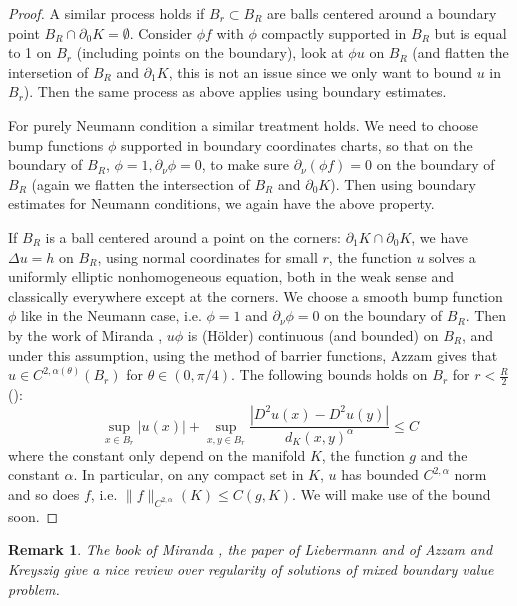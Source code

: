 \documentclass[12pt]{amsart}
\newcommand{\p}{\partial}
\newtheorem{remark}[theorem]{Remark}
\numberwithin{equation}{section}
\begin{document}
\begin{proof}
		A similar process holds if $B_r\subset B_R$ are balls centered around a boundary point $B_R \cap \partial_0 K = \emptyset$. Consider $\phi f$ with $\phi$ compactly supported in $B_R$ but is equal to 1 on $B_r$ (including points on the boundary), look at $\phi u$ on $B_R$ (and flatten the intersetion of $B_R$ and $\partial_1 K$, this is not an issue since we only want to bound $u$ in $B_r$). Then the same process as above applies using boundary estimates. 
		
		For purely Neumann condition a similar treatment holds. We need to choose bump functions $\phi$ supported in boundary coordinates charts, so that on the boundary of $B_R$, $\phi=1, \partial_{\nu}\phi=0$, to make sure $\partial_{\nu} (\phi f)=0$ on the boundary of $B_R$ (again we flatten the intersection of $B_R$  and $\partial_0 K$). Then using boundary estimates for Neumann conditions, we again have the above property.


		If $B_R$ is a ball centered around a point on the corners: $\partial_1 
		K \cap \partial_0 K$, we have $\Delta  u=h$ on $B_R$, using normal coordinates for small $r$, the function $u$ solves a uniformly elliptic nonhomogeneous equation, both in the weak sense and classically everywhere except at the corners. We choose a smooth bump function $\phi$ like in the Neumann case, i.e. $\phi=1$ and $\p_{\nu} \phi=0$ on the boundary of $B_R$. Then by the work of Miranda \cite{Miran1955-SulProblemaMisto},  $u\phi$ is (H\"older) continuous (and bounded)  on $B_R$, and under this assumption, using the method of barrier functions, Azzam  \cite{azzam1981smoothness} gives that $u \in C^{2,\alpha(\theta)}(B_r)$ for $\theta \in (0,\pi/4)$. 
		The following bounds holds on $B_r$ for $r <\frac{R}{2}$ (\cite{azzam1981smoothness}):
		\begin{equation} \label{regbound}
			\sup_{x\in B_r} |u(x)|+\sup_{x,y\in B_r}\frac{|D^2u(x)-D^2 u(y)|}{d_K(x,y)^{\alpha}}\leq C
		\end{equation}
		where the constant only depend on the manifold $K$, the function $g$ and the constant $\alpha$.
		In particular, on any compact set in $K$, $u$ has bounded $C^{2,\alpha}$ norm and so does $f$, i.e. $\|f\|_{C^{2,\alpha}}(K)\leq C(g,K)$. We will make use of the bound soon.
	\end{proof}

	\begin{remark}
		The book of Miranda \cite{Miran1970-PartialDifferentialEquations}, the paper of Liebermann \cite{Liebe1986-MixedBoundaryValue} and of Azzam and Kreyszig \cite{AzzamKreys1982-SolutionsEllipticEquations} give a nice review  over regularity of solutions of mixed boundary value problem. 
	\end{remark}
\end{document}
